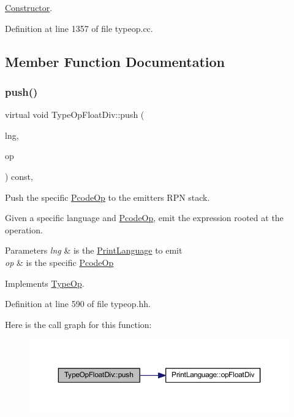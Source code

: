 \mbox{\hyperlink{class_constructor}{Constructor}}. 



Definition at line 1357 of file typeop.\+cc.



\subsection{Member Function Documentation}
\mbox{\label{class_type_op_float_div_a50164a276228622cf6232d2bfc310356}} 
\subsubsection{\texorpdfstring{push()}{push()}}
{\footnotesize\ttfamily virtual void Type\+Op\+Float\+Div\+::push (\begin{DoxyParamCaption}\item[{\mbox{\hyperlink{class_print_language}{Print\+Language}} $\ast$}]{lng,  }\item[{const \mbox{\hyperlink{class_pcode_op}{Pcode\+Op}} $\ast$}]{op }\end{DoxyParamCaption}) const\hspace{0.3cm}{\ttfamily [inline]}, {\ttfamily [virtual]}}



Push the specific \mbox{\hyperlink{class_pcode_op}{Pcode\+Op}} to the emitter\textquotesingle{}s R\+PN stack. 

Given a specific language and \mbox{\hyperlink{class_pcode_op}{Pcode\+Op}}, emit the expression rooted at the operation. 
\begin{DoxyParams}{Parameters}
{\em lng} & is the \mbox{\hyperlink{class_print_language}{Print\+Language}} to emit \\
\hline
{\em op} & is the specific \mbox{\hyperlink{class_pcode_op}{Pcode\+Op}} \\
\hline
\end{DoxyParams}


Implements \mbox{\hyperlink{class_type_op_ac9c9544203ed74dabe6ac662b653b2af}{Type\+Op}}.



Definition at line 590 of file typeop.\+hh.

Here is the call graph for this function\+:
\nopagebreak
\begin{figure}[H]
\begin{center}
\leavevmode
\includegraphics[width=350pt]{class_type_op_float_div_a50164a276228622cf6232d2bfc310356_cgraph}
\end{center}
\end{figure}


